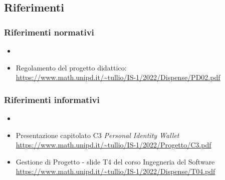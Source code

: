 \subsection{Riferimenti}

\subsubsection{Riferimenti normativi}
\begin{itemize}
    \item \NdPdocumento
    \item Regolamento del progetto didattico: \\
    \url{https://www.math.unipd.it/~tullio/IS-1/2022/Dispense/PD02.pdf}
\end{itemize}

\subsubsection{Riferimenti informativi}
\begin{itemize}
    \item \AdRdocumento
    \item Presentazione capitolato C3 \textit{Personal Identity Wallet} \\ \url{https://www.math.unipd.it/~tullio/IS-1/2022/Progetto/C3.pdf}
    \item Gestione di Progetto - slide T4 del corso Ingegneria del Software \\ \url{https://www.math.unipd.it/~tullio/IS-1/2022/Dispense/T04.pdf}
\end{itemize}




